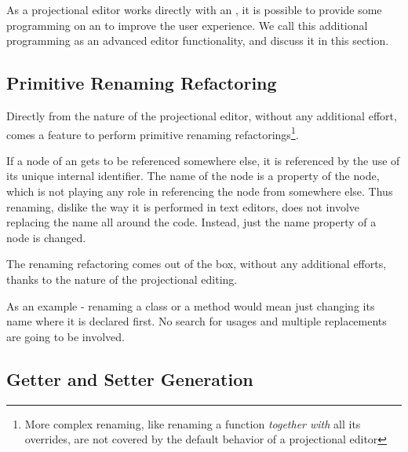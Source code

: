 
As a projectional editor works directly with an  , it is possible to provide some programming on an 
 to improve the user experience. We call this additional programming as an advanced editor functionality, and 
discuss it in this section.

\subsection{Primitive Renaming Refactoring}
Directly from the nature of the projectional editor, without any additional effort, comes a feature to 
perform primitive renaming refactorings\footnote{More complex renaming, like renaming a function \emph{together with} all its overrides,
are not covered by the default behavior of a projectional editor}.

If a node of an  gets to be referenced somewhere else, it is referenced by the use of its unique internal
identifier. The name of the node is a property of the node, which is not playing any role in
referencing the node from somewhere else. Thus renaming, dislike the way it is performed in text
editors, does not involve replacing the name all around the code. Instead, just the name property 
of a node is changed.

The renaming refactoring comes out of the box, without any additional efforts, thanks to the nature of the
projectional editing.

As an example - renaming a class or a method would mean just changing its name where it is declared first.
No search for usages and multiple replacements are going to be involved.



\subsection{Getter and Setter Generation}
\label{getterandsetter}

